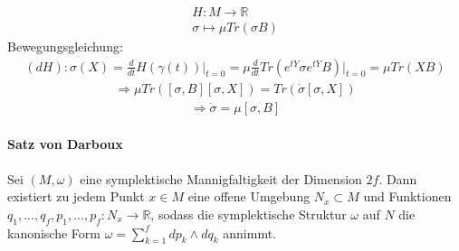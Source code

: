 \documentclass[10pt,a4paper]{article}
\begin{document}
\begin{align}
H: M \longrightarrow \mathbb{R} \\
\sigma \longmapsto \mu Tr(\sigma B)
\end{align}
Bewegungsgleichung:
\begin{align}
(dH):\sigma(X) =\frac{d}{dt} H(\gamma(t)) \vert_{t=0} = \mu \frac{d}{dt} Tr (e^{tY} \sigma e^{tY}B)\vert_{t=0}=\mu Tr(XB)
\end{align}
\begin{align}
\Rightarrow \mu Tr([\sigma,B][\sigma,X])=Tr(\dot{\sigma}[\sigma,X])
\end{align}
\begin{align}
\Rightarrow \dot{\sigma}= \mu [\sigma,B]
\end{align}
\paragraph{Satz von Darboux} $\,$ \\
Sei $(M,\omega) $ eine symplektische Mannigfaltigkeit der Dimension $2f$. Dann existiert zu jedem Punkt $x \in M$ eine offene Umgebung $ N_x \subset M$ und Funktionen \\$ q_1,...,q_f, p_1,...,p_f: N_x \longrightarrow \mathbb{R}$, sodass die symplektische Struktur $\omega$ auf $N$ die kanonische Form $ \omega= \sum_{k=1}^f dp_k \wedge dq_k $ annimmt.
\end{document}
